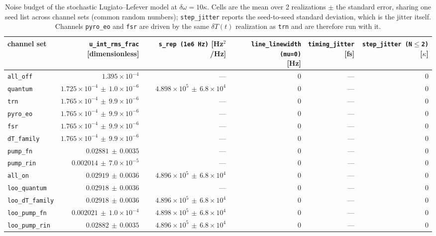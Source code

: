 \begin{table}[t]
  \centering
  \caption{Noise budget of the stochastic Lugiato--Lefever model at $\delta\omega = 10\kappa$. Cells are the mean over 2 realizations $\pm$ the standard error, sharing one seed list across channel sets (common random numbers); \texttt{step\_jitter} reports the seed-to-seed standard deviation, which is the jitter itself. Channels \texttt{pyro\_eo} and \texttt{fsr} are driven by the same $\delta T(t)$ realization as \texttt{trn} and are therefore run with it.}
  \label{tab:noise-budget}
  \begin{tabular}{lrrrrr}
    \toprule
    channel set & \shortstack{\texttt{u\_int\_rms\_frac}\\{[dimensionless]}} & \shortstack{\texttt{s\_rep (1e6 Hz)}\\{[Hz$^2$/Hz]}} & \shortstack{\texttt{line\_linewidth (mu=0)}\\{[Hz]}} & \shortstack{\texttt{timing\_jitter}\\{[fs]}} & \shortstack{\texttt{step\_jitter (N$\leq$2)}\\{[$\kappa$]}} \\
    \midrule
    \texttt{all\_off} & $1.395\times10^{-4}$ & --- & $0$ & --- & $0$ \\
    \texttt{quantum} & $1.725\times10^{-4}\,{\pm}\,1.0\times10^{-6}$ & $4.898\times10^{5}\,{\pm}\,6.8\times10^{4}$ & $0$ & --- & $0$ \\
    \texttt{trn} & $1.765\times10^{-4}\,{\pm}\,9.9\times10^{-6}$ & --- & $0$ & --- & $0$ \\
    \texttt{pyro\_eo} & $1.765\times10^{-4}\,{\pm}\,9.9\times10^{-6}$ & --- & $0$ & --- & $0$ \\
    \texttt{fsr} & $1.765\times10^{-4}\,{\pm}\,9.9\times10^{-6}$ & --- & $0$ & --- & $0$ \\
    \texttt{dT\_family} & $1.765\times10^{-4}\,{\pm}\,9.9\times10^{-6}$ & --- & $0$ & --- & $0$ \\
    \texttt{pump\_fn} & $0.02881\,{\pm}\,0.0035$ & --- & $0$ & --- & $0$ \\
    \texttt{pump\_rin} & $0.002014\,{\pm}\,7.0\times10^{-5}$ & --- & $0$ & --- & $0$ \\
    \midrule
    \texttt{all\_on} & $0.02919\,{\pm}\,0.0036$ & $4.896\times10^{5}\,{\pm}\,6.8\times10^{4}$ & $0$ & --- & $0$ \\
    \texttt{loo\_quantum} & $0.02918\,{\pm}\,0.0036$ & --- & $0$ & --- & $0$ \\
    \texttt{loo\_dT\_family} & $0.02918\,{\pm}\,0.0036$ & $4.896\times10^{5}\,{\pm}\,6.8\times10^{4}$ & $0$ & --- & $0$ \\
    \texttt{loo\_pump\_fn} & $0.002021\,{\pm}\,1.0\times10^{-4}$ & $4.898\times10^{5}\,{\pm}\,6.8\times10^{4}$ & $0$ & --- & $0$ \\
    \texttt{loo\_pump\_rin} & $0.02882\,{\pm}\,0.0035$ & $4.896\times10^{5}\,{\pm}\,6.8\times10^{4}$ & $0$ & --- & $0$ \\
    \bottomrule
  \end{tabular}
\end{table}

